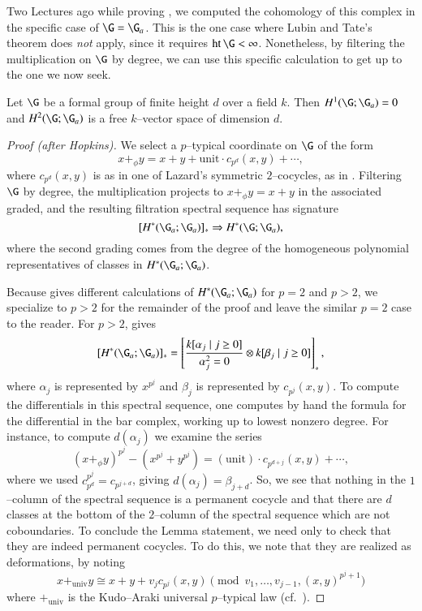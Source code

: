 Two Lectures ago while proving , we computed the cohomology of this complex in the specific case of $\G = \G_a$.  This is the one case where Lubin and Tate's theorem does \emph{not} apply, since it requires $\height \G < \infty$.  Nonetheless, by filtering the multiplication on $\G$ by degree, we can use this specific calculation to get up to the one we now seek.

\begin{lemma}\label{CalculationOfLTTangentSpace}
Let $\G$ be a formal group of finite height $d$ over a field $k$.  Then $H^1(\G; \G_a) = 0$ and $H^2(\G; \G_a)$ is a free $k$--vector space of dimension $d$.
\end{lemma}
\begin{proof}[Proof (after Hopkins)]
We select a $p$--typical coordinate on $\G$ of the form \[x +_\phi y = x + y + \mathrm{unit} \cdot c_{p^d}(x, y) + \cdots,\] where $c_{p^d}(x, y)$ is as in one of Lazard's symmetric $2$--cocycles, as in .  Filtering $\G$ by degree, the multiplication projects to $x +_\phi y = x + y$ in the associated graded, and the resulting filtration spectral sequence has signature \[[H^*(\G_a; \G_a)]_* \Rightarrow H^*(\G; \G_a),\] where the second grading comes from the degree of the homogeneous polynomial representatives of classes in $H^*(\G_a; \G_a)$.

Because  gives different calculations of $H^*(\G_a; \G_a)$ for $p = 2$ and $p > 2$, we specialize to $p > 2$ for the remainder of the proof and leave the similar $p = 2$ case to the reader.  For $p > 2$,  gives \[[H^*(\G_a; \G_a)]_* = \left[\frac{k[\alpha_j \mid j \ge 0]}{\alpha_j^2 = 0} \otimes k[\beta_j \mid j \ge 0]\right]_*,\] where $\alpha_j$ is represented by $x^{p^j}$ and $\beta_j$ is represented by $c_{p^j}(x, y)$.  To compute the differentials in this spectral sequence, one computes by hand the formula for the differential in the bar complex, working up to lowest nonzero degree.  For instance, to compute $d(\alpha_j)$ we examine the series \[(x +_\phi y)^{p^j} - (x^{p^j} + y^{p^j}) = (\text{unit}) \cdot c_{p^{d + j}}(x, y) + \cdots,\] where we used $c_{p^d}^{p^j} = c_{p^{j+d}}$, giving $d(\alpha_j) = \beta_{j+d}$.  So, we see that nothing in the $1$--column of the spectral sequence is a permanent cocycle and that there are $d$ classes at the bottom of the $2$--column of the spectral sequence which are not coboundaries.  To conclude the Lemma statement, we need only to check that they are indeed permanent cocycles.  To do this, we note that they are realized as deformations, by noting \[x +_{\mathrm{univ}} y \cong x + y + v_j c_{p^j}(x, y) \pmod{v_1, \ldots, v_{j-1}, (x, y)^{p^j+1}}\] where $+_{\mathrm{univ}}$ is the Kudo--Araki universal $p$--typical law (cf.\ \cite[Proposition 1.1]{LubinTate}).
\end{proof}

